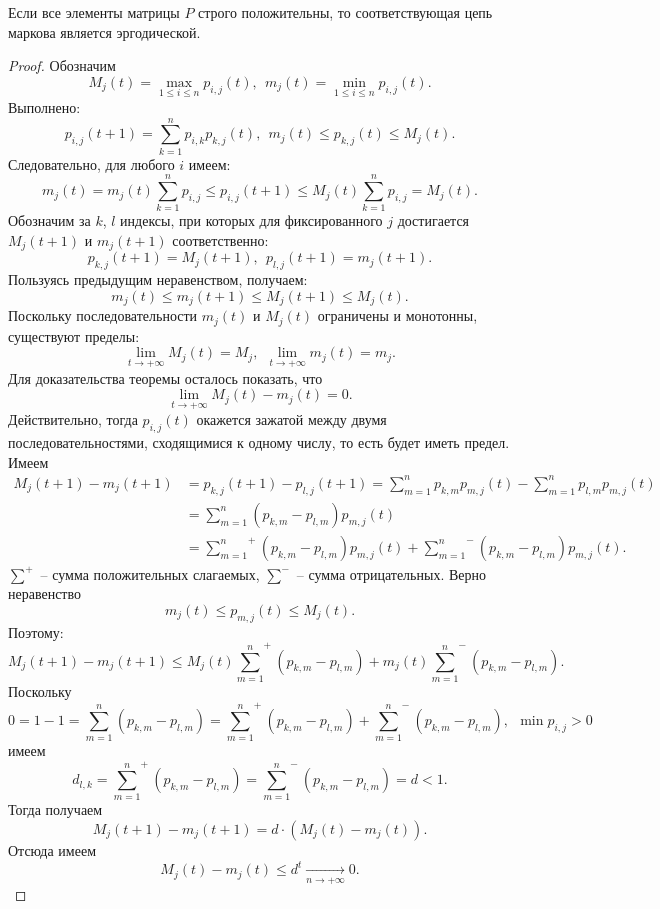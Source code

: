 \begin{theorem}
    Если все элементы матрицы $P$ строго положительны, то соответствующая
    цепь маркова является эргодической.
\end{theorem}
\begin{proof}
    Обозначим
    \[
        M_j(t) = \max_{1 \leqslant i \leqslant n}{p_{i, j}(t)},~~
        m_j(t) = \min_{1 \leqslant i \leqslant n}{p_{i, j}(t)}
    .\]
    Выполнено:
    \[
        p_{i, j}(t + 1) = \sum_{k = 1}^n{p_{i, k} p_{k, j}(t)},~~
        m_j(t) \leqslant p_{k, j}(t) \leqslant M_j(t)
    .\]
    Следовательно, для любого $i$ имеем:
    \[
        m_j(t) = m_j(t) \sum_{k = 1}^n{p_{i, j}} \leqslant p_{i, j}(t + 1)
        \leqslant M_j(t) \sum_{k = 1}^n{p_{i, j}} = M_j(t)
    .\]
    Обозначим за $k$, $l$ индексы, при которых для фиксированного $j$ достигается
    $M_j(t + 1)$ и $m_j(t + 1)$ соответственно:
    \[
        p_{k, j}(t + 1) = M_j(t + 1),~~
        p_{l, j}(t + 1) = m_j(t + 1)
    .\]
    Пользуясь предыдущим неравенством, получаем:
    \[
        m_j(t) \leqslant m_j(t + 1) \leqslant M_j(t + 1) \leqslant M_j(t)
    .\]
    Поскольку последовательности $m_j(t)$ и $M_j(t)$ ограничены и монотонны,
    существуют пределы:
    \[
        \lim_{t \to +\infty}{M_j(t)} = M_j,~~
        \lim_{t \to +\infty}{m_j(t)} = m_j
    .\]
    Для доказательства теоремы осталось показать, что 
    \[
        \lim_{t \to +\infty}{M_j(t) - m_j(t)} = 0
    .\]
    Действительно, тогда $p_{i, j}(t)$ окажется зажатой между 
    двумя последовательностями, сходящимися к одному числу, то есть будет иметь
    предел. Имеем
    \begin{align*}
        M_j(t + 1) - m_j(t + 1) 
        &= p_{k, j}(t + 1) - p_{l, j}(t + 1) = \sum_{m = 1}^n{p_{k, m} 
        p_{m, j}(t)} - \sum_{m = 1}^n{p_{l, m} p_{m, j}(t)} \\
        &= \sum_{m = 1}^n{(p_{k, m} - p_{l, m}) p_{m, j}(t)} \\
        &= {\sum_{m = 1}^n}^+{(p_{k, m} - p_{l, m}) p_{m, j}(t) } +
        {\sum_{m = 1}^n}^-{(p_{k, m} - p_{l, m}) p_{m, j}(t)}
    .\end{align*}
    $\sum^+$ -- сумма положительных слагаемых, $\sum^-$ -- сумма отрицательных.
    Верно неравенство
    \[
        m_j(t) \leqslant p_{m, j}(t) \leqslant M_j(t)
    .\]
    Поэтому:
    \[
        M_j(t + 1) - m_j(t + 1) \leqslant M_j(t) {\sum_{m = 1}^n}^+{(p_{k, m} - p_{l, m})}
        + m_j(t) {\sum_{m = 1}^n}^-{(p_{k, m} - p_{l, m})}
    .\]
    Поскольку
    \[
        0 = 1 - 1 = \sum_{m = 1}^n{(p_{k, m} - p_{l, m})} = 
        {\sum_{m = 1}^n}^+{(p_{k, m} - p_{l, m})} 
        + {\sum_{m = 1}^n}^-{(p_{k, m} - p_{l, m})},~~ \min{p_{i, j}} > 0
    \]
    имеем
    \[
        d_{l, k} = {\sum_{m = 1}^n}^+{(p_{k, m} - p_{l, m})} 
        = {\sum_{m = 1}^n}^-{(p_{k, m} - p_{l, m})} = d < 1
    .\]
    Тогда получаем
    \[
        M_j(t + 1) - m_j(t + 1) = d \cdot (M_j(t) - m_j(t))
    .\]
    Отсюда имеем
    \[
        M_j(t) - m_j(t) \leqslant d^t \xrightarrow[n \to +\infty]{} 0
    .\]
\end{proof}

